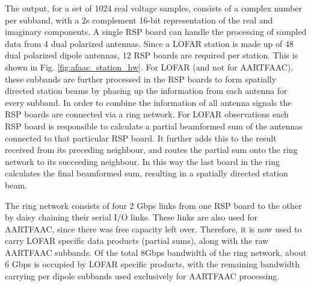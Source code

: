 \documentclass{ws-jai}
\begin{document}
The output, for a set of 1024 real voltage samples, consists of a complex number
per  subband,  with a  2s  complement  16-bit  representation  of the  real  and
imaginary components.  A  single RSP board can handle the  processing of sampled
data from 4 dual polarized antennas. Since a LOFAR station is made up of 48 dual
polarized dipole antennas, 12 RSP boards are required per station. This is shown
in Fig.   \ref{fig:afaac_station_hw}.  For LOFAR  (and not for  AARTFAAC), these
subbands are  further processed  in the  RSP boards  to form  spatially directed
station  beams  by phasing  up  the  information  from  each antenna  for  every
subband. In  order to  combine the  information of all  antenna signals  the RSP
boards are connected  via a ring network. For LOFAR  observations each RSP board
is responsible to  calculate a partial beamformed sum of  the antennas connected
to that particular RSP board.  It further  adds this to the result received from
its preceding neighbour, and routes the partial sum onto the ring network to its
succeeding neighbour.   In this way  the last board  in the ring  calculates the
final beamformed sum, resulting in a spatially directed station beam.

The ring network consists  of four 2 Gbps links from one RSP  board to the other
by  daisy chaining  their  serial I/O  links.   These links  are  also used  for
AARTFAAC, since there was free capacity left over.  Therefore, it is now used to
carry LOFAR specific  data products (partial sums), along with  the raw AARTFAAC
subbands. Of  the total  8Gbps bandwidth of  the ring network,  about 6  Gbps is
occupied by LOFAR  specific products, with the remaining  bandwidth carrying per
dipole subbands used exclusively for AARTFAAC processing.

\end{document}
